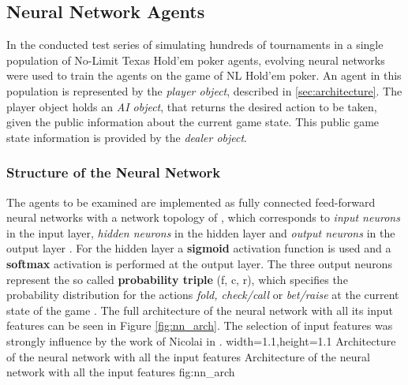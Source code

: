 \subsection{Neural Network Agents}
\label{subsec:nnagent}
In the conducted test series of simulating hundreds of tournaments in a single population of No-Limit Texas Hold'em poker agents, evolving neural networks were used to train the agents on the game of NL Hold'em poker. An agent in this population is represented by the \textit{player object}, described in \ref{sec:architecture}. The player object holds an \textit{AI object}, that returns the desired action to be taken, given the public information about the current game state. This public game state information is provided by the \textit{dealer object}.
\subsubsection{Structure of the Neural Network}
The agents to be examined are implemented as fully connected feed-forward neural networks with a network topology of , which corresponds to  \textit{input neurons} in the input layer,  \textit{hidden neurons} in the hidden layer and  \textit{output neurons} in the output layer \cite{ENN_garrett}. For the hidden layer a \textbf{sigmoid} activation function is used and a \textbf{softmax}  activation is performed at the output layer. The three output neurons represent the so called \textbf{probability triple} (f, c, r), which specifies the probability distribution for the actions \textit{fold, check/call} or \textit{bet/raise} at the current state of the game \cite{review}. The full architecture of the neural network with all its input features can be seen in Figure \ref{fig:nn_arch}. The selection of input features was strongly influence by the work of Nicolai in \cite{evolutionary_methods}. 
  {width=1.1\textwidth,height=1.1\textheight}%
  {Architecture of the neural network with all the input features}%
  {Architecture of the neural network with all the input features}%
  {fig:nn_arch}%
